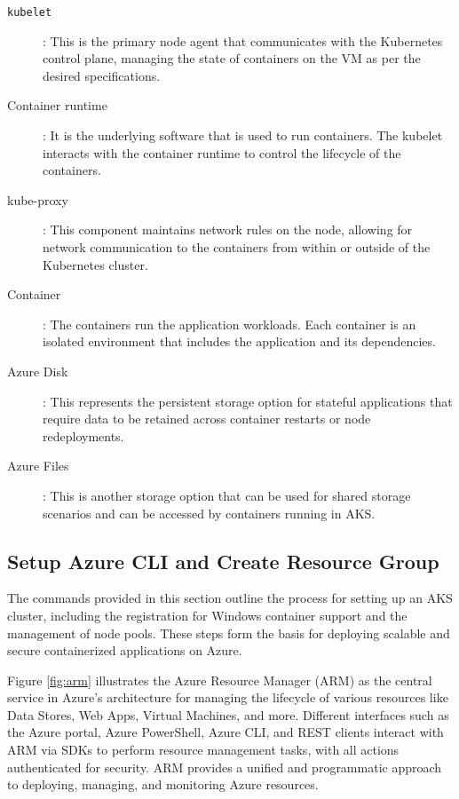 \documentclass{article}
\begin{document}
\begin{description}
\item[\texttt{kubelet}]: This is the primary node agent that communicates with the Kubernetes control plane, managing the state of containers on the VM as per the desired specifications. 

\item[Container runtime]: It is the underlying software that is used to run containers. The kubelet interacts with the container runtime to control the lifecycle of the containers.

\item[kube-proxy]: This component maintains network rules on the node, allowing for network communication to the containers from within or outside of the Kubernetes cluster.

\item[Container]: The containers run the application workloads. Each container is an isolated environment that includes the application and its dependencies. 

\item[Azure Disk]: This represents the persistent storage option for stateful applications that require data to be retained across container restarts or node redeployments. 

\item[Azure Files]: This is another storage option that can be used for shared storage scenarios and can be accessed by containers running in AKS. 
\end{description} 


\subsection{Setup Azure CLI and Create Resource Group}

The commands provided in this section outline the process for setting up an AKS cluster, including the registration for Windows container support and the management of node pools. These steps form the basis for deploying scalable and secure containerized applications on Azure.


Figure \ref{fig:arm} \cite{arm} illustrates the Azure Resource Manager (ARM) as the central service in Azure's architecture for managing the lifecycle of various resources like Data Stores, Web Apps, Virtual Machines, and more. Different interfaces such as the Azure portal, Azure PowerShell, Azure CLI, and REST clients interact with ARM via SDKs to perform resource management tasks, with all actions authenticated for security. ARM provides a unified and programmatic approach to deploying, managing, and monitoring Azure resources.
\end{document}

